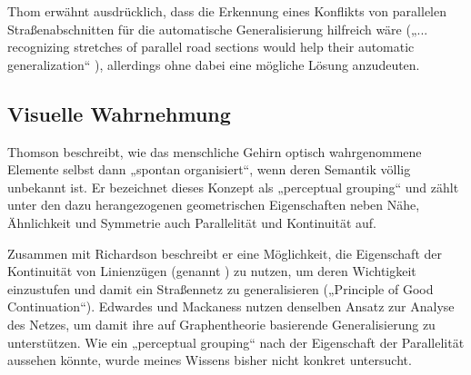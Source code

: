 \documentclass[../main/thesis.tex]{subfiles}
\begin{document}

Thom erwähnt ausdrücklich, dass die Erkennung eines Konflikts von parallelen Straßenabschnitten für die automatische Generalisierung hilfreich wäre („... recognizing stretches of parallel road sections would help their automatic generalization“ ), allerdings ohne dabei eine mögliche Lösung anzudeuten.


\subsection{Visuelle Wahrnehmung}


Thomson beschreibt, wie das menschliche Gehirn optisch wahrgenommene Elemente selbst dann „spontan organisiert“, wenn deren Semantik völlig unbekannt ist.
Er bezeichnet dieses Konzept als „perceptual grouping“ und zählt unter den dazu herangezogenen geometrischen Eigenschaften neben Nähe, Ähnlichkeit und Symmetrie auch Parallelität und Kontinuität auf. 


Zusammen mit Richardson beschreibt er eine Möglichkeit, die Eigenschaft der Kontinuität von Linienzügen (genannt ) zu nutzen, um deren Wichtigkeit einzustufen und damit ein Straßennetz zu generalisieren („Principle of Good Continuation“). 
Edwardes und Mackaness nutzen denselben Ansatz zur Analyse des Netzes, um damit ihre auf Graphentheorie basierende Generalisierung zu unterstützen. 
Wie ein „perceptual grouping“ nach der Eigenschaft der Parallelität aussehen könnte, wurde meines Wissens bisher nicht konkret untersucht.
\end{document}
